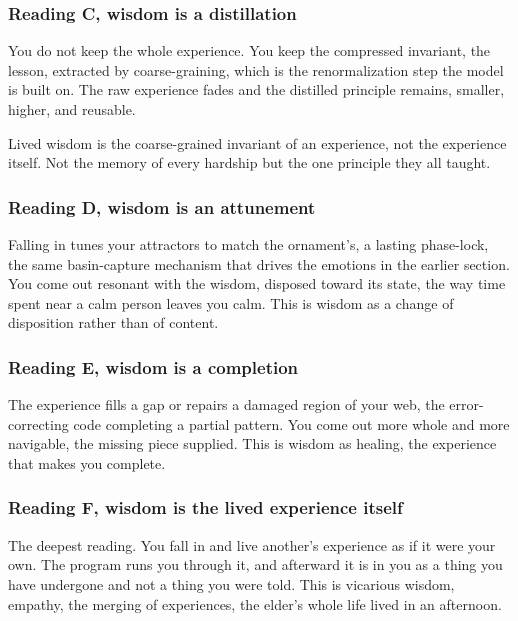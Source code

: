 \subsubsection{Reading C, wisdom is a distillation}

You do not keep the whole experience. You keep the compressed invariant, the lesson, extracted by coarse-graining, which is the renormalization step the model is built on. The raw experience fades and the distilled principle remains, smaller, higher, and reusable.

\begin{result}
Lived wisdom is the coarse-grained invariant of an experience, not the experience itself. Not the memory of every hardship but the one principle they all taught.
\end{result}

\subsubsection{Reading D, wisdom is an attunement}

Falling in tunes your attractors to match the ornament's, a lasting phase-lock, the same basin-capture mechanism that drives the emotions in the earlier section. You come out resonant with the wisdom, disposed toward its state, the way time spent near a calm person leaves you calm. This is wisdom as a change of disposition rather than of content.

\subsubsection{Reading E, wisdom is a completion}

The experience fills a gap or repairs a damaged region of your web, the error-correcting code completing a partial pattern. You come out more whole and more navigable, the missing piece supplied. This is wisdom as healing, the experience that makes you complete.

\subsubsection{Reading F, wisdom is the lived experience itself}

The deepest reading. You fall in and live another's experience as if it were your own. The program runs you through it, and afterward it is in you as a thing you have undergone and not a thing you were told. This is vicarious wisdom, empathy, the merging of experiences, the elder's whole life lived in an afternoon.

